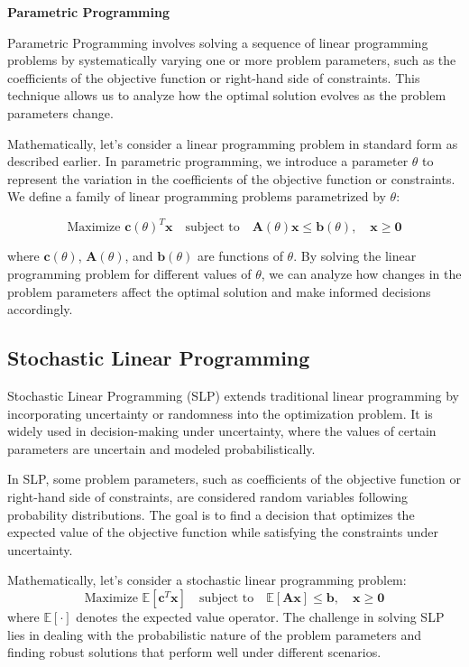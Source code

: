 \documentclass[12pt]{book} %
\begin{document}
\textbf{Parametric Programming}

Parametric Programming involves solving a sequence of linear programming problems by systematically varying one or more problem parameters, such as the coefficients of the objective function or right-hand side of constraints. This technique allows us to analyze how the optimal solution evolves as the problem parameters change.

Mathematically, let's consider a linear programming problem in standard form as described earlier. In parametric programming, we introduce a parameter $\theta$ to represent the variation in the coefficients of the objective function or constraints. We define a family of linear programming problems parametrized by $\theta$:

\[
\text{Maximize } \mathbf{c}(\theta)^T \mathbf{x} \quad \text{subject to} \quad \mathbf{A}(\theta)\mathbf{x} \leq \mathbf{b}(\theta), \quad \mathbf{x} \geq \mathbf{0}
\]

where $\mathbf{c}(\theta)$, $\mathbf{A}(\theta)$, and $\mathbf{b}(\theta)$ are functions of $\theta$. By solving the linear programming problem for different values of $\theta$, we can analyze how changes in the problem parameters affect the optimal solution and make informed decisions accordingly.

\subsection{Stochastic Linear Programming}

Stochastic Linear Programming (SLP) extends traditional linear programming by incorporating uncertainty or randomness into the optimization problem. It is widely used in decision-making under uncertainty, where the values of certain parameters are uncertain and modeled probabilistically.

In SLP, some problem parameters, such as coefficients of the objective function or right-hand side of constraints, are considered random variables following probability distributions. The goal is to find a decision that optimizes the expected value of the objective function while satisfying the constraints under uncertainty.

Mathematically, let's consider a stochastic linear programming problem:
\[
\text{Maximize } \mathbb{E}[\mathbf{c}^T \mathbf{x}] \quad \text{subject to} \quad \mathbb{E}[\mathbf{Ax}] \leq \mathbf{b}, \quad \mathbf{x} \geq \mathbf{0}
\]
where $\mathbb{E}[\cdot]$ denotes the expected value operator. The challenge in solving SLP lies in dealing with the probabilistic nature of the problem parameters and finding robust solutions that perform well under different scenarios.
\end{document}
